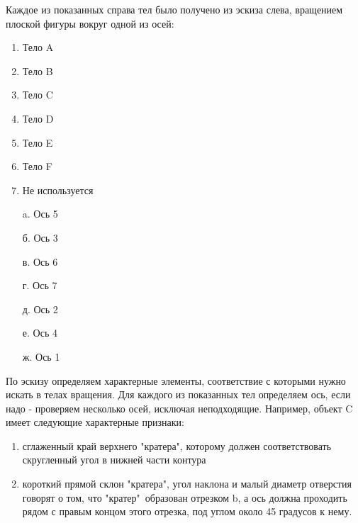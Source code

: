 
Каждое из показанных справа тел было получено из эскиза слева, вращением плоской фигуры вокруг одной из осей:  


\begin{multicols}{2}
    {
        \begin{enumerate}
            \item Тело A
            \item Тело B
            \item Тело C
            \item Тело D
            \item Тело E
            \item Тело F
            \item Не используется
        \end{enumerate}
    }
    {
        \begin{enumerate}
            \item[a.] Ось 5
            \item[б.] Ось 3
            \item[в.] Ось 6
            \item[г.] Ось 7
            \item[д.] Ось 2
            \item[е.] Ось 4
            \item[ж.] Ось 1      
        \end{enumerate}
    }
\end{multicols}

\solutionSection

По эскизу определяем характерные элементы, соответствие с которыми нужно искать в телах вращения. Для каждого из показанных тел определяем ось, если надо - проверяем несколько осей, исключая неподходящие.  Например, объект C имеет следующие характерные признаки:
\begin{enumerate}
    \item сглаженный край верхнего "кратера"{}, которому должен соответствовать скругленный угол в нижней части контура
    \item короткий прямой склон "кратера"{}, угол наклона и малый диаметр отверстия говорят о том, что "кратер"\ образован отрезком b, а ось должна проходить рядом с правым концом этого отрезка, под углом около 45 градусов к нему.
\end{enumerate}


